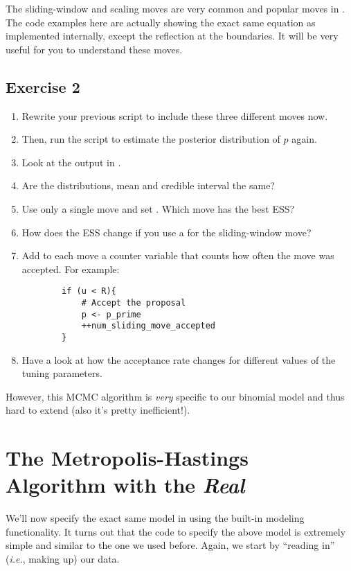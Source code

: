 \begin{framed}
The sliding-window and scaling moves are very common and popular moves in \RevBayes.
The code examples here are actually showing the exact same equation as implemented internally, except the reflection at the boundaries.
It will be very useful for you to understand these moves.	
\end{framed}




\subsection{Exercise 2}

\begin{enumerate}[label=\textnormal{Step \arabic*)}]
	\item Rewrite your previous script to include these three different moves now.
	\item Then, run the script to estimate the posterior distribution of $p$ again.
	\item Look at the output in \Tracer.
	\item Are the distributions, mean and credible interval the same?
	\item Use only a single move and set . Which move has the best ESS?
	\item How does the ESS change if you use a  for the sliding-window move?
	\item Add to each move a counter variable that counts how often the move was accepted. For example:
{\tt \begin{snugshade*}
\begin{lstlisting}    
        if (u < R){
            # Accept the proposal
            p <- p_prime
            ++num_sliding_move_accepted
        } \end{lstlisting}
\end{snugshade*}}
	\item Have a look at how the acceptance rate changes for different values of the tuning parameters.
\end{enumerate}


However, this MCMC algorithm is \emph{very} specific to our binomial model and thus hard to extend (also it's pretty inefficient!).


\section{The Metropolis-Hastings Algorithm with the \emph{Real} \RevBayes}
We'll now specify the exact same model in \Rev using the built-in modeling functionality.
It turns out that the \Rev code to specify the above model is extremely simple and similar to the one we used before.
Again, we start by ``reading in'' (\emph{i.e.}, making up) our data.

